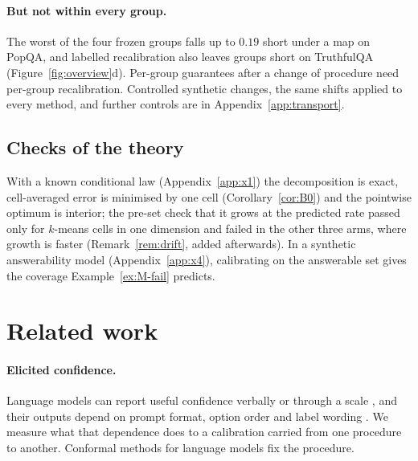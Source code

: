 \documentclass[twoside]{article}
\theoremstyle{definition}
\theoremstyle{remark}
\newcommand{\1}{\mathbf{1}}
\begin{document}
\paragraph{But not within every group.} The worst of the four frozen groups falls up to $0.19$ short under a map
on PopQA, and labelled recalibration also leaves groups short on TruthfulQA (Figure~\ref{fig:overview}d).
Per-group guarantees after a change of procedure need per-group recalibration. Controlled synthetic changes,
the same shifts applied to every method, and further controls are in Appendix~\ref{app:transport}.

\subsection{Checks of the theory}

With a known conditional law (Appendix~\ref{app:x1}) the decomposition is exact, cell-averaged error is
minimised by one cell (Corollary~\ref{cor:B0}) and the pointwise optimum is interior; the pre-set check that it
grows at the predicted rate passed only for $k$-means cells in one dimension and failed in the other three
arms, where growth is faster (Remark~\ref{rem:drift}, added afterwards). In a synthetic answerability model
(Appendix~\ref{app:x4}), calibrating on the answerable set gives the coverage Example~\ref{ex:M-fail} predicts.

\section{Related work}
\label{sec:related}
\paragraph{Elicited confidence.} Language models can report useful confidence verbally or through a scale
\citep{kadavath2022language,lin2022teaching,tian2023just,xiong2024can}, and their outputs depend on prompt format,
option order and label wording \citep{zhao2021calibrate,sclar2024quantifying,zheng2024large}. We measure what that
dependence does to a calibration carried from one procedure to another. Conformal methods for language models
\citep{quach2024conformal,mohri2024language,cherian2024large} fix the procedure.
\end{document}
